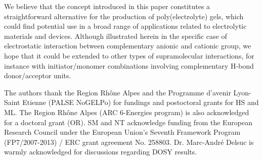 \documentclass[prl,a4paper,twocolumn,superscriptaddress,showkeys]{revtex4}
\begin{document}
We believe that the concept introduced in this paper constitutes a straightforward alternative for the production of poly(electrolyte) gels, which could find potential use in a broad range of applications related to electrolytic materials and devices. Although illustrated herein in the specific case of electrostatic interaction between complementary anionic and cationic group, we hope that it could be extended to other types of supramolecular interactions, for instance with initiator/monomer combinations involving complementary H-bond donor/acceptor units.

\begin{acknowledgments}
The authors thank the Region Rhône Alpes and the Programme d'avenir Lyon- Saint Etienne (PALSE NoGELPo) for fundings and postoctoral grants for HS and ML. The Region Rhône Alpes (ARC 6-Energies program) is also acknowledged for a doctoral grant (OR). SM and NT acknowledge funding from the European Research Council under the European Union's Seventh Framework Program (FP7/2007-2013) / ERC grant agreement No. 258803. Dr. Marc-André Delsuc is warmly acknowledged for discussions regarding DOSY results.
\end{acknowledgments}


\end{document}
